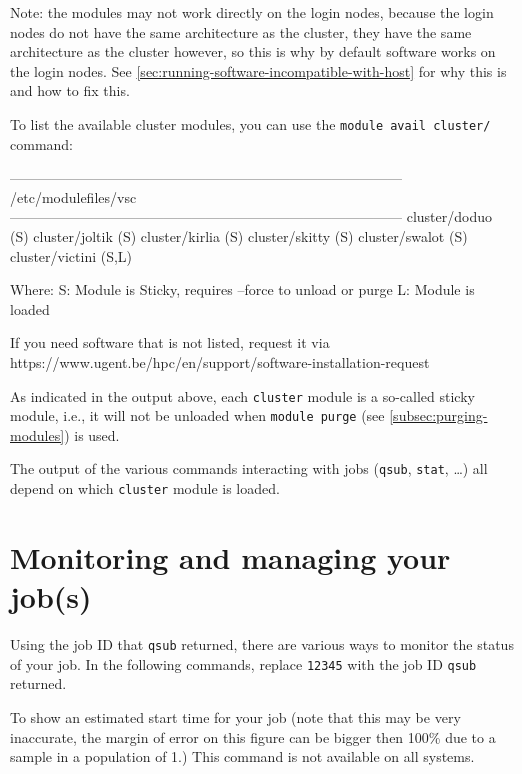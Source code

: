 Note: the \othercluster modules may not work directly on the login nodes, because the
login nodes do not have the same architecture as the \othercluster cluster, they
have the same architecture as the  cluster however, so this is why
by default software works on the login nodes. See \autoref{sec:running-software-incompatible-with-host}
for why this is and how to fix this.

To list the available cluster modules, you can use the \lstinline|module avail cluster/| command:
\begin{prompt}
------------------------------------------------------------------------------------ /etc/modulefiles/vsc ------------------------------------------------------------------------------------
   cluster/doduo (S)    cluster/joltik (S)    cluster/kirlia (S)    cluster/skitty (S)    cluster/swalot (S)    cluster/victini (S,L)

  Where:
   S:  Module is Sticky, requires --force to unload or purge
   L:  Module is loaded

If you need software that is not listed, request it via https://www.ugent.be/hpc/en/support/software-installation-request
\end{prompt}

As indicated in the output above, each \lstinline|cluster| module is a so-called sticky
module, i.e., it will not be unloaded when \lstinline|module purge| (see \autoref{subsec:purging-modules}) is used.

The output of the various commands interacting with jobs (\lstinline|qsub|, \lstinline|stat|, \ldots)
all depend on which \lstinline|cluster| module is loaded.
\fi


\section{Monitoring and managing your job(s)}
\label{sec:monitoring-and-managing-your-jobs}

Using the job ID that \lstinline|qsub| returned, there are various ways to monitor
the status of your job. In the following commands, replace \lstinline|12345|
with the job ID \lstinline|qsub| returned.



\begin{prompt}
\end{prompt}

\ifgent
\else
\ifbrussel
\else
  To show an estimated start time for your job (note that this may be very inaccurate,
  the margin of error on this figure can be bigger then 100\% due to a sample in a
  population of 1.)
  This command is not available on all systems.

